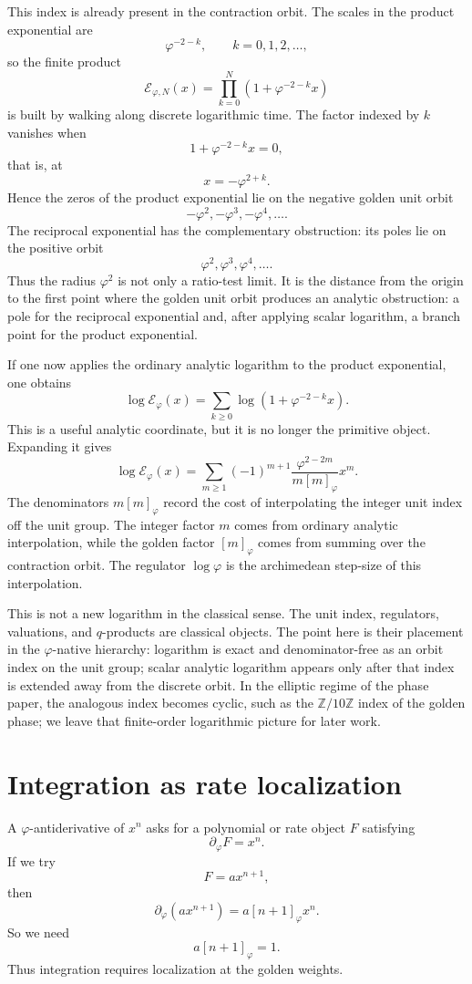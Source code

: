 \documentclass[11pt]{article}
\newcommand{\ph}{\varphi}
\newcommand{\Z}{\mathbb{Z}}
\newcommand{\dd}{\partial_{\ph}}
\newcommand{\Etw}{\mathcal E_{\ph}}
\begin{document}
This index is already present in the contraction orbit.  The scales in the product exponential are
\[
    \ph^{-2-k},\qquad k=0,1,2,\ldots,
\]
so the finite product
\[
    \mathcal E_{\ph,N}(x)=\prod_{k=0}^{N}(1+\ph^{-2-k}x)
\]
is built by walking along discrete logarithmic time.  The factor indexed by $k$ vanishes when
\[
    1+\ph^{-2-k}x=0,
\]
that is, at
\[
    x=-\ph^{2+k}.
\]
Hence the zeros of the product exponential lie on the negative golden unit orbit
\[
    -\ph^2,-\ph^3,-\ph^4,\ldots.
\]
The reciprocal exponential has the complementary obstruction: its poles lie on the positive orbit
\[
    \ph^2,\ph^3,\ph^4,\ldots.
\]
Thus the radius $\ph^2$ is not only a ratio-test limit.  It is the distance from the origin to the first point where the golden unit orbit produces an analytic obstruction: a pole for the reciprocal exponential and, after applying scalar logarithm, a branch point for the product exponential.

If one now applies the ordinary analytic logarithm to the product exponential, one obtains
\[
    \log \Etw(x)=\sum_{k\ge0}\log(1+\ph^{-2-k}x).
\]
This is a useful analytic coordinate, but it is no longer the primitive object.  Expanding it gives
\[
    \log \Etw(x)
    =\sum_{m\ge1}(-1)^{m+1}
      \frac{\ph^{2-2m}}{m[m]_{\ph}}x^m.
\]
The denominators $m[m]_{\ph}$ record the cost of interpolating the integer unit index off the unit group.  The integer factor $m$ comes from ordinary analytic interpolation, while the golden factor $[m]_{\ph}$ comes from summing over the contraction orbit.  The regulator $\log\ph$ is the archimedean step-size of this interpolation.

This is not a new logarithm in the classical sense.  The unit index, regulators, valuations, and $q$-products are classical objects.  The point here is their placement in the $\ph$-native hierarchy: logarithm is exact and denominator-free as an orbit index on the unit group; scalar analytic logarithm appears only after that index is extended away from the discrete orbit.  In the elliptic regime of the phase paper, the analogous index becomes cyclic, such as the $\Z/10\Z$ index of the golden phase; we leave that finite-order logarithmic picture for later work.

\section{Integration as rate localization}

A $\ph$-antiderivative of $x^n$ asks for a polynomial or rate object $F$ satisfying
\[
    \dd F=x^n.
\]
If we try
\[
    F=a x^{n+1},
\]
then
\[
    \dd(a x^{n+1})=a[n+1]_{\ph}x^n.
\]
So we need
\[
    a[n+1]_{\ph}=1.
\]
Thus integration requires localization at the golden weights.
\end{document}
